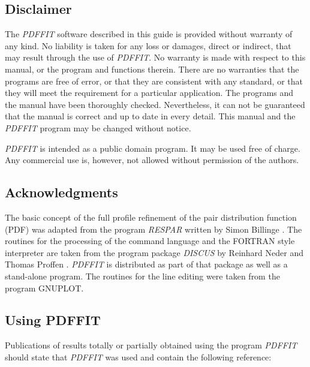 \documentclass[11pt]{report}
\begin{document}
\subsection*{Disclaimer}

The {\it PDFFIT} software described in this guide is
provided without warranty of any kind.  No liability is taken for any loss
or damages, direct or indirect, that may result through the use of {\it
PDFFIT}.  No warranty is made with respect to this manual, or the program
and functions therein.  There are no warranties that the programs are free
of error, or that they are consistent with any standard, or that they will
meet the requirement for a particular application.  The programs and the
manual have been thoroughly checked.  Nevertheless, it can not be
guaranteed that the manual is correct and up to date in every detail. This
manual and the {\it PDFFIT} program may be changed without notice.\par

{\it PDFFIT} is intended as a public domain program. It may be used free
of charge.  Any commercial use is, however, not allowed without permission
of the authors.


\subsection*{Acknowledgments}

The basic concept of the full profile refinement of the
pair distribution function (PDF) was adapted from the program {\it RESPAR}
written by Simon Billinge \citep{billi;b;lsfd98}. The routines for the
processing of the command language and the FORTRAN style interpreter are
taken from the program package {\it DISCUS} by Reinhard Neder and Thomas
Proffen \citep{prne97}. {\it PDFFIT} is distributed as part of that package
as well as a stand-alone program. The routines for the line editing were
taken from the program GNUPLOT.


\subsection*{Using PDFFIT}

Publications of results totally or partially obtained using the program
{\it PDFFIT} should state that {\it PDFFIT} was used and contain the
following reference:
\end{document}
